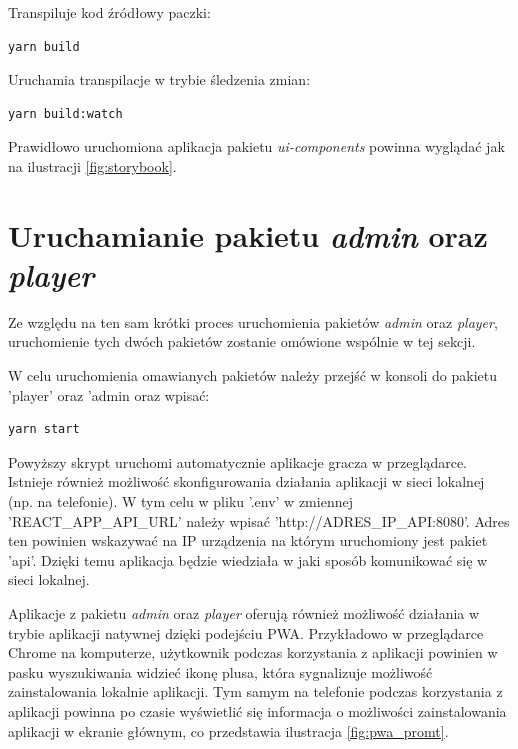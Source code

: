 Transpiluje kod źródłowy paczki:
\begin{lstlisting}
yarn build
\end{lstlisting}

Uruchamia transpilacje w trybie śledzenia zmian:
\begin{lstlisting}
yarn build:watch
\end{lstlisting}

Prawidłowo uruchomiona aplikacja pakietu \textit{ui-components} powinna wyglądać jak na ilustracji \ref{fig:storybook}.

\section{Uruchamianie pakietu \textit{admin} oraz \textit{player}}
Ze względu na ten sam krótki proces uruchomienia pakietów \textit{admin} oraz \textit{player}, uruchomienie tych dwóch pakietów zostanie omówione wspólnie w tej sekcji.

W celu uruchomienia omawianych pakietów należy przejść w konsoli do pakietu 'player' oraz 'admin oraz wpisać:

\begin{lstlisting}
yarn start
\end{lstlisting}

Powyższy skrypt uruchomi automatycznie aplikacje gracza w przeglądarce. Istnieje również możliwość skonfigurowania działania aplikacji w sieci lokalnej (np. na telefonie). W tym celu w pliku '.env' w zmiennej 'REACT\_APP\_API\_URL' należy wpisać 'http://{ADRES\_IP\_API}:8080'. Adres ten powinien wskazywać na IP urządzenia na którym uruchomiony jest pakiet 'api'. Dzięki temu aplikacja będzie wiedziała w jaki sposób komunikować się w sieci lokalnej.

Aplikacje z pakietu \textit{admin} oraz \textit{player} oferują również możliwość działania w trybie aplikacji natywnej dzięki podejściu PWA. Przykładowo w przeglądarce Chrome na komputerze, użytkownik podczas korzystania z aplikacji powinien w pasku wyszukiwania widzieć ikonę plusa, która sygnalizuje możliwość zainstalowania lokalnie aplikacji. Tym samym na telefonie podczas korzystania z aplikacji powinna po czasie wyświetlić się informacja o możliwości zainstalowania aplikacji w ekranie głównym, co przedstawia ilustracja \ref{fig:pwa_promt}.

